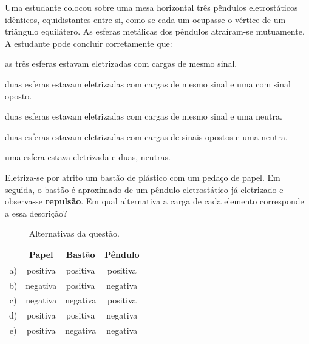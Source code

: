 \begin{questao}[2]{}
Uma estudante colocou sobre uma mesa horizontal três pêndulos eletrostáticos
idênticos, equidistantes entre si, como se cada um ocupasse o vértice de um
triângulo equilátero. As esferas metálicas dos pêndulos atraíram-se mutuamente.
A estudante pode concluir corretamente que:
\begin{alternativas}
\item as três esferas estavam eletrizadas com cargas de mesmo sinal.
\item duas esferas estavam eletrizadas com cargas de mesmo sinal e uma com sinal oposto.
\item duas esferas estavam eletrizadas com cargas de mesmo sinal e uma neutra.
\item duas esferas estavam eletrizadas com cargas de sinais opostos e uma neutra.
\item uma esfera estava eletrizada e duas, neutras.
\end{alternativas}
\end{questao}

\begin{questao}[2]{}
Eletriza-se por atrito um bastão de plástico com um pedaço de papel. Em seguida,
o bastão é aproximado de um pêndulo eletrostático já eletrizado e observa-se
\textbf{repulsão}. Em qual alternativa a carga de cada elemento corresponde a
essa descrição?

\begin{table}[H]
\centering
\small\sffamily
\setlength{\arraystretch}{1.25}
\begin{tabular}{@{}c c c c@{}}
\toprule
 & \textbf{Papel} & \textbf{Bastão} & \textbf{Pêndulo}\\
\midrule
a) & positiva & positiva & positiva\\
b) & negativa & positiva & negativa\\
c) & negativa & negativa & positiva\\
d) & positiva & positiva & negativa\\
e) & positiva & negativa & negativa\\
\bottomrule
\end{tabular}
\caption{Alternativas da questão.}
\end{table}
\end{questao}

